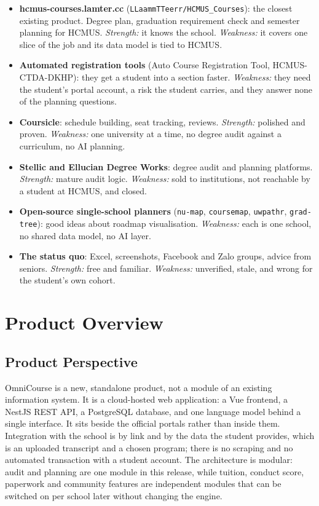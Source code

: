 \documentclass{article}
\begin{document}
\begin{itemize}
  \item \textbf{hcmus-courses.lamter.cc} (\texttt{LLaammTTeerr/HCMUS\_Courses}): the closest existing product. Degree plan,
        graduation requirement check and semester planning for HCMUS. \emph{Strength:} it knows the school.
        \emph{Weakness:} it covers one slice of the job and its data model is tied to HCMUS.
  \item \textbf{Automated registration tools} (Auto Course Registration Tool, HCMUS-CTDA-DKHP): they get a student into a
        section faster. \emph{Weakness:} they need the student's portal account, a risk the student carries, and they
        answer none of the planning questions.
  \item \textbf{Coursicle}: schedule building, seat tracking, reviews. \emph{Strength:} polished and proven.
        \emph{Weakness:} one university at a time, no degree audit against a curriculum, no AI planning.
  \item \textbf{Stellic and Ellucian Degree Works}: degree audit and planning platforms. \emph{Strength:} mature audit
        logic. \emph{Weakness:} sold to institutions, not reachable by a student at HCMUS, and closed.
  \item \textbf{Open-source single-school planners} (\texttt{nu-map}, \texttt{coursemap}, \texttt{uwpathr},
        \texttt{grad-tree}): good ideas about roadmap visualisation. \emph{Weakness:} each is one school, no shared data
        model, no AI layer.
  \item \textbf{The status quo}: Excel, screenshots, Facebook and Zalo groups, advice from seniors. \emph{Strength:} free
        and familiar. \emph{Weakness:} unverified, stale, and wrong for the student's own cohort.
\end{itemize}

\section{Product Overview}
\subsection{Product Perspective}
OmniCourse is a new, standalone product, not a module of an existing information system. It is a cloud-hosted web
application: a Vue frontend, a NestJS REST API, a PostgreSQL database, and one language model behind a single interface. It
sits beside the official portals rather than inside them. Integration with the school is by link and by the data the
student provides, which is an uploaded transcript and a chosen program; there is no scraping and no automated transaction
with a student account. The architecture is modular: audit and planning are one module in this release, while tuition,
conduct score, paperwork and community features are independent modules that can be switched on per school later without
changing the engine.
\end{document}
